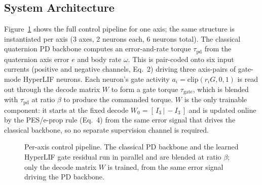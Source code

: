 \documentclass[conference]{IEEEtran}
\begin{document}
\subsection{System Architecture}\label{sec:architecture}
Figure~\ref{fig:architecture} shows the full control pipeline for one axis; the
same structure is instantiated per axis (3 axes, 2 neurons each, 6 neurons
total). The classical quaternion PD backbone computes an error-and-rate torque
$\tau_\mathrm{pd}$ from the quaternion axis error $e$ and body rate $\omega$.
This is pair-coded onto six input currents (positive and negative channels,
Eq.~2) driving three axis-pairs of gate-mode HyperLIF neurons. Each neuron's
gate activity $a_i=\mathrm{clip}(r_i G,0,1)$ is read out through the decode
matrix $W$ to form a gate torque $\tau_\mathrm{gate}$, which is blended with
$\tau_\mathrm{pd}$ at ratio $\beta$ to produce the commanded torque. $W$ is the
only trainable component: it starts at the fixed decode $W_0=[\,I_3\,|\,{-}I_3\,]$
and is updated online by the PES/e-prop rule (Eq.~4) from the same error signal
that drives the classical backbone, so no separate supervision channel is
required.

\begin{figure}[t]
\centering
{}
\caption{Per-axis control pipeline. The classical PD backbone and the learned
HyperLIF gate residual run in parallel and are blended at ratio $\beta$; only
the decode matrix $W$ is trained, from the same error signal driving the PD
backbone.}
\label{fig:architecture}
\end{figure}
\end{document}
